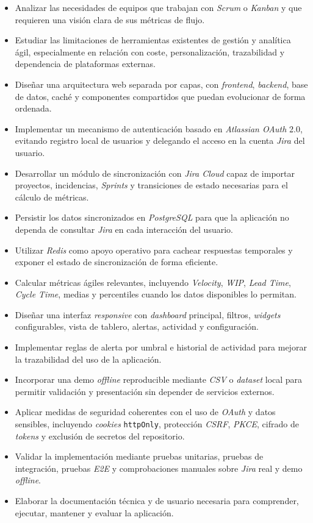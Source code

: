 \begin{itemize}
    \item Analizar las necesidades de equipos que trabajan con \textit{Scrum} o \textit{Kanban} y que requieren una visión clara de sus métricas de flujo.
    \item Estudiar las limitaciones de herramientas existentes de gestión y analítica ágil, especialmente en relación con coste, personalización, trazabilidad y dependencia de plataformas externas.
    \item Diseñar una arquitectura web separada por capas, con \textit{frontend}, \textit{backend}, base de datos, caché y componentes compartidos que puedan evolucionar de forma ordenada.
    \item Implementar un mecanismo de autenticación basado en \textit{Atlassian OAuth} 2.0, evitando registro local de usuarios y delegando el acceso en la cuenta \textit{Jira} del usuario.
    \item Desarrollar un módulo de sincronización con \textit{Jira Cloud} capaz de importar proyectos, incidencias, \textit{Sprints} y transiciones de estado necesarias para el cálculo de métricas.
    \item Persistir los datos sincronizados en \textit{PostgreSQL} para que la aplicación no dependa de consultar \textit{Jira} en cada interacción del usuario.
    \item Utilizar \textit{Redis} como apoyo operativo para cachear respuestas temporales y exponer el estado de sincronización de forma eficiente.
    \item Calcular métricas ágiles relevantes, incluyendo \textit{Velocity}, \textit{WIP}, \textit{Lead Time}, \textit{Cycle Time}, medias y percentiles cuando los datos disponibles lo permitan.
    \item Diseñar una interfaz \textit{responsive} con \textit{dashboard} principal, filtros, \textit{widgets} configurables, vista de tablero, alertas, actividad y configuración.
    \item Implementar reglas de alerta por umbral e historial de actividad para mejorar la trazabilidad del uso de la aplicación.
    \item Incorporar una demo \textit{offline} reproducible mediante \textit{CSV} o \textit{dataset} local para permitir validación y presentación sin depender de servicios externos.
    \item Aplicar medidas de seguridad coherentes con el uso de \textit{OAuth} y datos sensibles, incluyendo \textit{cookies} \texttt{httpOnly}, protección \textit{CSRF}, \textit{PKCE}, cifrado de \textit{tokens} y exclusión de secretos del repositorio.
    \item Validar la implementación mediante pruebas unitarias, pruebas de integración, pruebas \textit{E2E} y comprobaciones manuales sobre \textit{Jira} real y demo \textit{offline}.
    \item Elaborar la documentación técnica y de usuario necesaria para comprender, ejecutar, mantener y evaluar la aplicación.
\end{itemize}

